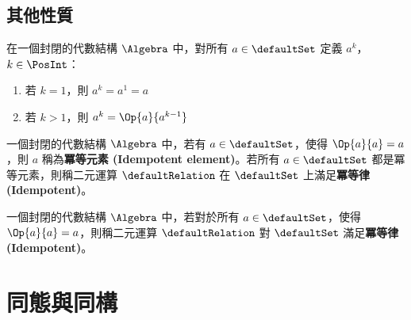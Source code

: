 \documentclass[12pt,a4paper,oneside]{report}
\begin{document}
\begin{CJK}{UTF8}{bkai}
\subsection{其他性質}

\begin{mydef}[連乘]
在一個封閉的代數結構 $\Algebra$ 中，對所有 $a\in{\defaultSet}$ 定義 $a^k$，$k\in{\PosInt}$：
\begin{enumerate}
\item 若 $k=1$，則 $a^k=a^1=a$
\item 若 $k>1$，則 $a^k=\Op{a}{a^{k-1}}$
\end{enumerate}
\end{mydef}

\begin{mydef}[冪等元素與冪等律]
\label{def:algebra:idempotent}
一個封閉的代數結構 $\Algebra$ 中，若有 $a\in{\defaultSet}$，使得 $\Op{a}{a}=a$，則 $a$ 稱為\textbf{冪等元素 (Idempotent element)}。若所有 $a\in{\defaultSet}$ 都是冪等元素，則稱二元運算 $\defaultRelation$ 在 $\defaultSet$ 上滿足\textbf{冪等律 (Idempotent)}。
\end{mydef}

\begin{mydef}[冪零律]
\label{def:algebra:nilpotent}
一個封閉的代數結構 $\Algebra$ 中，若對於所有 $a\in{\defaultSet}$，使得 $\Op{a}{a}=a$，則稱二元運算 $\defaultRelation$ 對 $\defaultSet$ 滿足\textbf{冪等律 (Idempotent)}。
\end{mydef}

\section{同態與同構}


\end{CJK}
\end{document}
